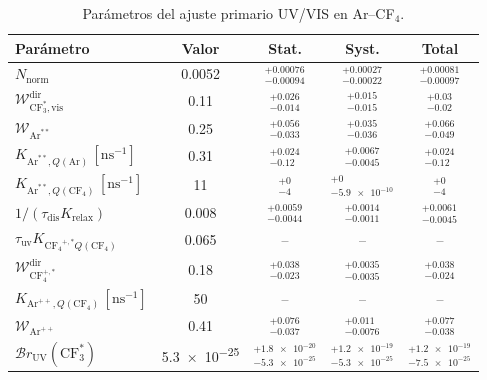 \begin{table}[htbp]
\centering
\caption{Parámetros del ajuste primario UV/VIS en Ar--CF$_4$.}
\label{tab:ArCF4_primary_stat_syst}
\begin{tabular}{lcccc}
\toprule
Parámetro & Valor & Stat. & Syst. & Total \\
\midrule
$N_{\mathrm{norm}}$ & \num{0.0052} & $^{+\num{0.00076}}_{-\num{0.00094}}$ & $^{+\num{0.00027}}_{-\num{0.00022}}$ & $^{+\num{0.00081}}_{-\num{0.00097}}$ \\
$\mathcal{W}_{\mathrm{CF}_3^*,\mathrm{vis}}^{\mathrm{dir}}$ & \num{0.11} & $^{+\num{0.026}}_{-\num{0.014}}$ & $^{+\num{0.015}}_{-\num{0.015}}$ & $^{+\num{0.03}}_{-\num{0.02}}$ \\
$\mathcal{W}_{\mathrm{Ar}^{**}}$ & \num{0.25} & $^{+\num{0.056}}_{-\num{0.033}}$ & $^{+\num{0.035}}_{-\num{0.036}}$ & $^{+\num{0.066}}_{-\num{0.049}}$ \\
$K_{\mathrm{Ar}^{**},Q(\mathrm{Ar})}\,[\mathrm{ns}^{-1}]$ & \num{0.31} & $^{+\num{0.024}}_{-\num{0.12}}$ & $^{+\num{0.0067}}_{-\num{0.0045}}$ & $^{+\num{0.024}}_{-\num{0.12}}$ \\
$K_{\mathrm{Ar}^{**},Q(\mathrm{CF}_4)}\,[\mathrm{ns}^{-1}]$ & \num{11} & $^{+\num{0}}_{-\num{4}}$ & $^{+\num{0}}_{-\num{5.9e-10}}$ & $^{+\num{0}}_{-\num{4}}$ \\
$1/(\tau_{\mathrm{dis}}K_{\mathrm{relax}})$ & \num{0.008} & $^{+\num{0.0059}}_{-\num{0.0044}}$ & $^{+\num{0.0014}}_{-\num{0.0011}}$ & $^{+\num{0.0061}}_{-\num{0.0045}}$ \\
$\tau_{\mathrm{uv}}K_{\mathrm{CF_4}^{+,*}Q(\mathrm{CF}_4)}$ & \num{0.065} & -- & -- & -- \\
$\mathcal{W}_{\mathrm{CF}_4^{+,*}}^{\mathrm{dir}}$ & \num{0.18} & $^{+\num{0.038}}_{-\num{0.023}}$ & $^{+\num{0.0035}}_{-\num{0.0035}}$ & $^{+\num{0.038}}_{-\num{0.024}}$ \\
$K_{\mathrm{Ar}^{++},Q(\mathrm{CF}_4)}\,[\mathrm{ns}^{-1}]$ & \num{50} & -- & -- & -- \\
$\mathcal{W}_{\mathrm{Ar}^{++}}$ & \num{0.41} & $^{+\num{0.076}}_{-\num{0.037}}$ & $^{+\num{0.011}}_{-\num{0.0076}}$ & $^{+\num{0.077}}_{-\num{0.038}}$ \\
$\mathcal{B}r_{\mathrm{UV}}(\mathrm{CF}_3^*)$ & \num{5.3e-25} & $^{+\num{1.8e-20}}_{-\num{5.3e-25}}$ & $^{+\num{1.2e-19}}_{-\num{5.3e-25}}$ & $^{+\num{1.2e-19}}_{-\num{7.5e-25}}$ \\
\bottomrule
\end{tabular}
\end{table}

